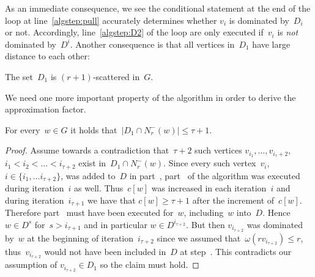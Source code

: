 \noindent
As an immediate consequence, we see the conditional statement at the end of
the loop at line~\ref{algstep:pull} accurately determines whether $v_i$ is
dominated by~$D_i$ or not. Accordingly, line~\ref{algstep:D2}
of the loop are only executed if~$v_i$ is \emph{not} dominated by~$D^i$.
Another consequence is that all vertices in~$D_1$ have large distance to
each other:

\begin{corollary}
  The set~$D_1$ is $(r+1)$-scattered in~$G$.
\end{corollary}

\noindent
We need one more important property of the algorithm in order to derive
the approximation factor.

\begin{lemma}\label{lemma:D1-intersection}
  For every~$w \in G$ it holds that~$|D_1 \cap N^-_r(w)| \leq \tau+1$.
\end{lemma}
\begin{proof}
  Assume towards a contradiction that~$\tau+2$ such vertices
  $v_{i_1},\ldots,v_{i_\tau+2}$, $i_1 < i_2 < \ldots < i_{\tau+2}$ exist in~$D_1
  \cap N^-_r(w)$. Since every such vertex~$v_i$, $i \in \{i_1,\ldots
  i_{\tau+2}\}$, was added to~$D$ in part~, part~ of the
  algorithm was executed during iteration~$i$ as well. Thus~$c[w]$ was
  increased in each iteration~$i$ and during iteration~$i_{\tau+1}$ we have that
  $c[w] \geq \tau + 1$ after the increment of~$c[w]$. Therefore part~
  must have been executed for~$w$, including~$w$ into~$D$. Hence~$w \in D^s$
  for~$s > i_{\tau+1}$ and in particular $w \in D^{i_{\tau+2}}$. But then
  $v_{i_{\tau+2}}$ was dominated by~$w$ at the beginning of iteration~$i_{\tau+2}$
  since we assumed that~$\omega(rv_{i_{\tau+2}}) \leq r$, thus~$v_{i_{\tau+2}}$
  would not have been included in~$D$ at step~. This contradicts our
  assumption of $v_{i_{\tau+2}} \in D_1$ so the claim must hold.
\end{proof}


